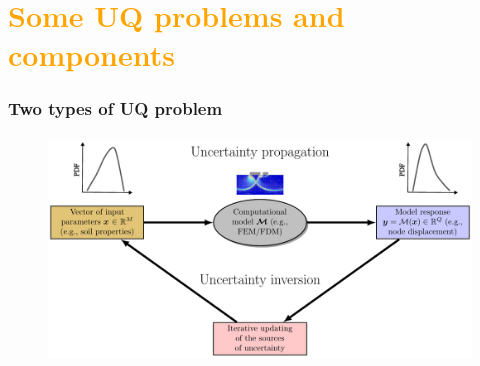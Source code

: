 
\section{\textcolor{orange}{Some UQ problems and components}}
\begin{frame}
	\frametitle{Two types of UQ problem}
	\framesubtitle{} %
        \begin{figure}
            \includegraphics[scale=0.7]{figures/figure-UQ_steps.pdf}
        \end{figure}
\end{frame}


